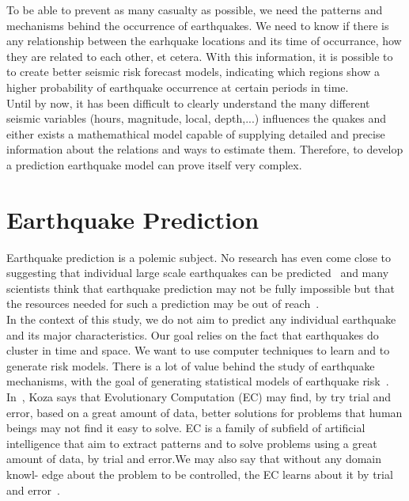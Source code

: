 To be able to prevent as many casualty as possible, we need the patterns and mechanisms behind the occurrence of earthquakes. We need to know if there is any relationship between the earhquake locations and its time of occurrance, how they are related to each other, et cetera. With this information, it is possible to to create better seismic risk forecast models, indicating which regions show a higher probability of earthquake occurrence at certain periods in time. \\

Until by now, it has been difficult to clearly understand the many different seismic variables (hours, magnitude, local, depth,...) influences the quakes and either exists a mathemathical model capable of supplying detailed and precise information about the relations and ways to estimate them. Therefore, to develop a prediction earthquake model can prove itself very complex.\\

\section{Earthquake Prediction}

Earthquake prediction is a polemic subject. No research has even come close to suggesting that individual large scale earthquakes can be predicted~\cite{ecta14} and many scientists think that earthquake prediction may not be fully impossible but that the resources needed for such a prediction may be out of reach~\cite{eberhard2014multiscale}.\\

In the context of this study, we do not aim to predict any individual earthquake and its major characteristics. Our goal relies on the fact that earthquakes do cluster in time and space. We want to use computer techniques to learn and to generate risk models. There is a lot of value behind the study of earthquake mechanisms, with the goal of generating statistical models of earthquake risk~\cite{Nature1999}.\\

In~\cite{Koza2003}, Koza says that Evolutionary Computation (EC) may find, by try trial and error, based on a great amount of data, better solutions for problems that human beings may not find it easy to solve. EC is a family of subfield of artificial intelligence that aim to extract patterns and to solve problems using a great amount of data, by trial and error.We may also say that without any domain knowl- edge about the problem to be controlled, the EC learns about it by trial and error~\cite{Michie94machinelearning}.\

